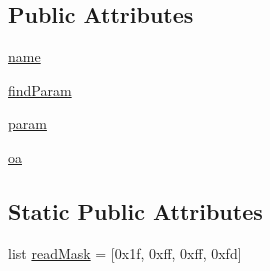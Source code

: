 \subsection*{Public Attributes}
\begin{DoxyCompactItemize}
\item 
\hyperlink{classsoftware_1_1chipwhisperer_1_1capture_1_1scopes_1_1__OpenADCInterface_1_1ClockSettings_ab8ad338dbd17ed7177906b8c3beffb30}{name}
\item 
\hyperlink{classsoftware_1_1chipwhisperer_1_1capture_1_1scopes_1_1__OpenADCInterface_1_1ClockSettings_aefe0273291fbbb916e75797d41869c2e}{find\+Param}
\item 
\hyperlink{classsoftware_1_1chipwhisperer_1_1capture_1_1scopes_1_1__OpenADCInterface_1_1ClockSettings_a8d906833259d8a68d7a464e6f9a9f8f0}{param}
\item 
\hyperlink{classsoftware_1_1chipwhisperer_1_1capture_1_1scopes_1_1__OpenADCInterface_1_1ClockSettings_a9c613956356f900839e8886255d5e605}{oa}
\end{DoxyCompactItemize}
\subsection*{Static Public Attributes}
\begin{DoxyCompactItemize}
\item 
list \hyperlink{classsoftware_1_1chipwhisperer_1_1capture_1_1scopes_1_1__OpenADCInterface_1_1ClockSettings_af900c99ec33571fd03e3d151b3b748c6}{read\+Mask} = \mbox{[}0x1f, 0xff, 0xff, 0xfd\mbox{]}
\end{DoxyCompactItemize}


